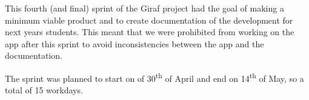 This fourth (and final) sprint of the Giraf project had the goal of making a minimum viable product and to create documentation of the development for next years students.
This meant that we were prohibited from working on the app after this sprint to avoid inconsistencies between the app and the documentation.

The sprint was planned to start on of 30\textsuperscript{th} of April and end on 14\textsuperscript{th} of May, so a total of 15 workdays.
